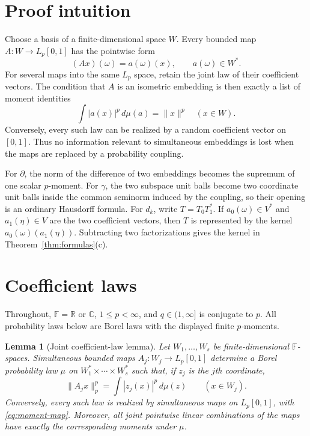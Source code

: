 \documentclass[11pt]{article}
\newtheorem{lemma}[theorem]{Lemma}
\newcommand{\F}{\mathbb F}
\begin{document}
\section{Proof intuition}

Choose a basis of a finite-dimensional space $W$.  Every bounded map
$A:W\to L_p[0,1]$ has the pointwise form
\[
       (Ax)(\omega)=a(\omega)(x),
       \qquad a(\omega)\in W^*.
\]
For several maps into the same $L_p$ space, retain the joint law of their
coefficient vectors.  The condition that $A$ is an isometric embedding is
then exactly a list of moment identities
\[
       \int |a(x)|^p\,d\mu(a)=\|x\|^p \quad(x\in W).
\]
Conversely, every such law can be realized by a random coefficient vector
on $[0,1]$.  Thus no information relevant to simultaneous embeddings is
lost when the maps are replaced by a probability coupling.

For $\partial$, the norm of the difference of two embeddings becomes the
supremum of one scalar $p$-moment.  For $\gamma$, the two subspace unit
balls become two coordinate unit balls inside the common seminorm induced
by the coupling, so their opening is an ordinary Hausdorff formula.  For
$d_k$, write $T=T_0T_1^*$.  If $a_0(\omega)\in V^*$ and
$a_1(\eta)\in V$ are the two coefficient vectors, then $T$ is represented
by the kernel $a_0(\omega)(a_1(\eta))$.  Subtracting two factorizations gives
the kernel in Theorem~\ref{thm:formulas}(c).

\section{Coefficient laws}

Throughout, $\F=\mathbb R$ or $\mathbb C$, $1\leq p<\infty$, and
$q\in(1,\infty]$ is conjugate to $p$.  All probability laws below are
Borel laws with the displayed finite $p$-moments.

\begin{lemma}[Joint coefficient-law lemma]\label{lem:law}
Let $W_1,\ldots,W_s$ be finite-dimensional $\F$-spaces.  Simultaneous
bounded maps $A_j:W_j\to L_p[0,1]$ determine a Borel probability law $\mu$
on $W_1^*\times\cdots\times W_s^*$ such that, if $z_j$ is the $j$th
coordinate,
\begin{equation}\label{eq:moment-map}
       \|A_jx\|_p^p=\int |z_j(x)|^p\,d\mu(z)
       \qquad(x\in W_j).
\end{equation}
Conversely, every such law is realized by simultaneous maps on
$L_p[0,1]$, with \eqref{eq:moment-map}.  Moreover, all joint pointwise
linear combinations of the maps have exactly the corresponding moments
under $\mu$.
\end{lemma}
\end{document}
